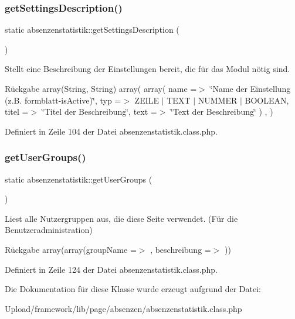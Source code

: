 \subsubsection{\texorpdfstring{get\+Settings\+Description()}{getSettingsDescription()}}
{\footnotesize\ttfamily static absenzenstatistik\+::get\+Settings\+Description (\begin{DoxyParamCaption}{ }\end{DoxyParamCaption})\hspace{0.3cm}{\ttfamily [static]}}

Stellt eine Beschreibung der Einstellungen bereit, die für das Modul nötig sind. \begin{DoxyReturn}{Rückgabe}
array(\+String, String) array( array( \textquotesingle{}name\textquotesingle{} =$>$ \char`\"{}\+Name der Einstellung (z.\+B. formblatt-\/is\+Active)\char`\"{}, \textquotesingle{}typ\textquotesingle{} =$>$ Z\+E\+I\+LE $\vert$ T\+E\+XT $\vert$ N\+U\+M\+M\+ER $\vert$ B\+O\+O\+L\+E\+AN, \textquotesingle{}titel\textquotesingle{} =$>$ \char`\"{}\+Titel der Beschreibung\char`\"{}, \textquotesingle{}text\textquotesingle{} =$>$ \char`\"{}\+Text der Beschreibung\char`\"{} ) , ) 
\end{DoxyReturn}


Definiert in Zeile 104 der Datei absenzenstatistik.\+class.\+php.

\mbox{\label{classabsenzenstatistik_a05f364fa3136d72fe1e88e2a03348b66}} 
\subsubsection{\texorpdfstring{get\+User\+Groups()}{getUserGroups()}}
{\footnotesize\ttfamily static absenzenstatistik\+::get\+User\+Groups (\begin{DoxyParamCaption}{ }\end{DoxyParamCaption})\hspace{0.3cm}{\ttfamily [static]}}

Liest alle Nutzergruppen aus, die diese Seite verwendet. (Für die Benutzeradministration) \begin{DoxyReturn}{Rückgabe}
array(array(\textquotesingle{}group\+Name\textquotesingle{} =$>$ \textquotesingle{}\textquotesingle{}, \textquotesingle{}beschreibung\textquotesingle{} =$>$ \textquotesingle{}\textquotesingle{})) 
\end{DoxyReturn}


Definiert in Zeile 124 der Datei absenzenstatistik.\+class.\+php.



Die Dokumentation für diese Klasse wurde erzeugt aufgrund der Datei\+:\begin{DoxyCompactItemize}
\item 
Upload/framework/lib/page/absenzen/absenzenstatistik.\+class.\+php\end{DoxyCompactItemize}
